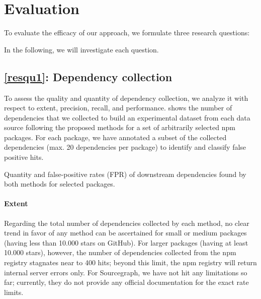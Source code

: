 \section{Evaluation}
\label{sec:evaluation}

To evaluate the efficacy of our approach, we formulate three research questions:


In the following, we will investigate each question.

\subsection{\ref{resqu1}: Dependency collection}
\label{sec:evaluation/resqu1}

To assess the quality and quantity of dependency collection, we analyze it with respect to extent, precision, recall, and performance.
 shows the number of dependencies that we collected to build an experimental dataset from each data source following the proposed methods for a set of arbitrarily selected npm packages.
For each package, we have annotated a subset of the collected dependencies (max. 20 dependencies per package) to identify and classify false positive hits.

\begin{table}
	\caption{Quantity and false-positive rates (FPR) of downstream dependencies found by both methods for selected packages.}
	\label{tab:evaluation/resqu1/quantities}

	\centering
	\small
	
\end{table}

\paragraph{Extent}
\label{sec:evaluation/resqu1/extent}

Regarding the total number of dependencies collected by each method, no clear trend in favor of any method can be ascertained for small or medium packages (having less than \num{10,000} stars on GitHub).
For larger packages (having at least \num{10,000} stars), however, the number of dependencies collected from the npm registry stagnates near to 400 hits; beyond this limit, the npm registry will return internal server errors only.
For Sourcegraph, we have not hit any limitations so far; currently, they do not provide any official documentation for the exact rate limits.

